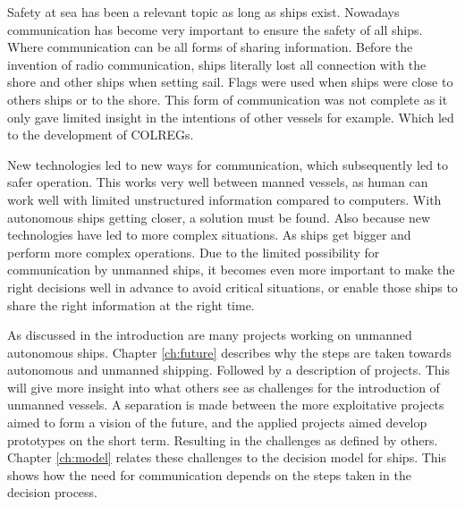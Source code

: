 Safety at sea has been a relevant topic as long as ships exist. Nowadays communication has become very important to ensure the safety of all ships. Where communication can be all forms of sharing information. Before the invention of radio communication, ships literally lost all connection with the shore and other ships when setting sail. Flags were used when ships were close to others ships or to the shore. This form of communication was not complete as it only gave limited insight in the intentions of other vessels for example. Which led to the development of \ac{COLREGs}. 

New technologies led to new ways for communication, which subsequently led to safer operation. This works very well between manned vessels, as human can work well with limited unstructured information compared to computers. With autonomous ships getting closer, a solution must be found. Also because new technologies have led to more complex situations. As ships get bigger and perform more complex operations. Due to the limited possibility for communication by unmanned ships, it becomes even more important to make the right decisions well in advance to avoid critical situations, or enable those ships to share the right information at the right time.

As discussed in the introduction are many projects working on unmanned autonomous ships. Chapter \ref{ch:future} describes why the steps are taken towards autonomous and unmanned shipping. Followed by a description of projects. This will give more insight into what others see as challenges for the introduction of unmanned vessels. A separation is made between the more exploitative projects aimed to form a vision of the future, and the applied projects aimed develop prototypes on the short term. Resulting in the challenges as defined by others.
Chapter \ref{ch:model} relates these challenges to the decision model for ships. This shows how the need for communication depends on the steps taken in the decision process.

